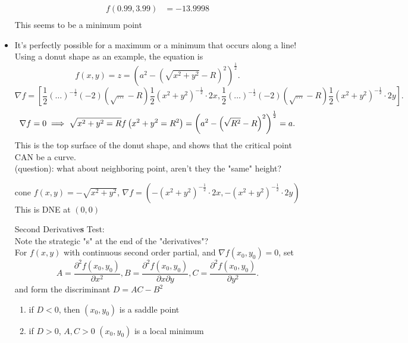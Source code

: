 \begin{itemize}
\begin{example}
\begin{align*}
				f\left( 0.99, 3.99 \right) &= -13.9998 \\
			\end{align*}
			This seems to be a minimum point
		\end{example}
	\item It's perfectly possible for a maximum or a minimum that occurs along a line!\\
		Using a donut shape as an example, the equation is \[
		f\left( x,y \right)  = z =  \left( a^2 - \left( \sqrt{x^2 + y^2} -R \right) ^2 \right) ^\frac{1}{2}
		.\] 
		\[
			\nabla f = \left[ \frac{1}{2}\left( \ldots \right) ^{-\frac{1}{2}}\left( -2 \right) \left( \sqrt{\ldots} -R \right) \frac{1}{2}\left( x^2 + y^2 \right) ^{-\frac{1}{2}} \cdot 2x, \frac{1}{2}\left( \ldots \right) ^{-\frac{1}{2}}\left( -2 \right) \left( \sqrt{\ldots} -R \right) \frac{1}{2}\left( x^2 + y^2 \right) ^{-\frac{1}{2}} \cdot  2y\right] 
		.\] 
		\[
		 \nabla f = 0 \implies \sqrt{x^2 + y^2 = R}\\
		 f\left( x^2 + y^2 = R^2 \right)  = \left( a^2 - \left( \sqrt{R^2}  - R \right) ^2 \right) ^{\frac{1}{2}} = a\\
		.\] 
		This is the top surface of the donut shape, and shows that the critical point CAN be a curve.\\
		(question): what about neighboring point, aren't they the "same" height?
		\begin{example}
			cone $f\left( x,y \right)  = -\sqrt{x^2 + y^2} $, $\nabla f = \left( -\left( x^2 + y^2 \right) ^{-\frac{1}{2}}\cdot 2x, -\left( x^2 + y^2 \right) ^{-\frac{1}{2}} \cdot 2y \right) $ This is DNE at $\left( 0,0 \right) $
		\end{example}
		\begin{theorem}
			Second Derivative\textbf{s} Test:\\
			Note the strategic "s" at the end of the "derivatives"?\\
			For $f\left( x,y \right) $ with continuous second order partial, and $\nabla f\left( x_0,y_0 \right)  = 0$, set \[
			A = \frac{\partial ^2f\left( x_0,y_0 \right) }{\partial x^2} , B = \frac{\partial ^2f\left( x_0,y_0 \right)}{\partial x \partial y}, C = \frac{\partial ^2f\left( x_0,y_0 \right) }{\partial y^2} 
			.\] 
			and form the discriminant $ D = AC-B^2$\\
			\begin{enumerate}
				\item if $D < 0$, then $\left( x_0,y_0 \right) $ is a saddle point\\
				\item if $D > 0$, $A,C > 0$ $\left( x_0,y_0 \right) $ is a local minimum\\

\end{enumerate}
\end{theorem}
\end{itemize}
